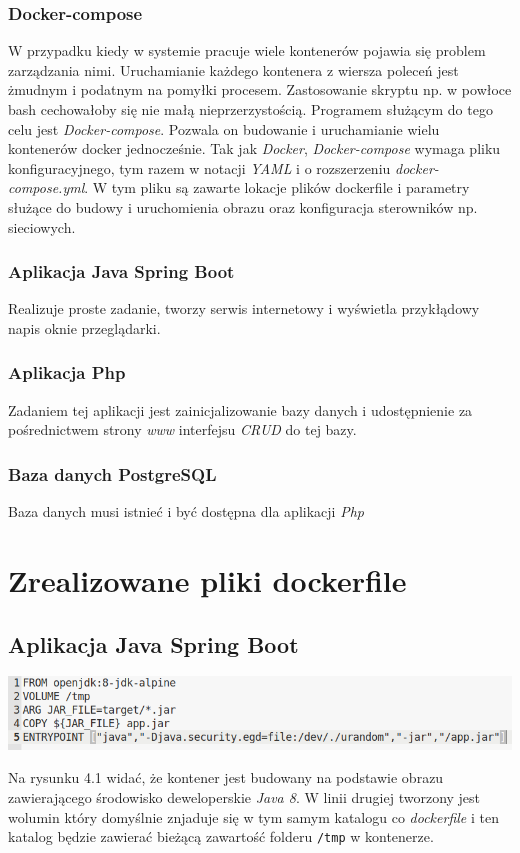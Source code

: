 \documentclass[polish, a4paper, 12pt, oneside]{book}
\begin{document}
\subsubsection{Docker-compose}
W przypadku kiedy w systemie pracuje wiele kontenerów pojawia się problem zarządzania nimi. Uruchamianie każdego kontenera z wiersza poleceń jest żmudnym i podatnym na pomyłki procesem. Zastosowanie skryptu np. w powłoce bash cechowałoby się nie małą nieprzerzystością. Programem służącym do tego celu jest \textit{Docker-compose}. Pozwala on budowanie i uruchamianie wielu kontenerów docker jednocześnie. Tak jak \textit{Docker}\cite{docker}, \textit{Docker-compose}\cite{dockercompose} wymaga pliku konfiguracyjnego, tym razem w notacji \textit{YAML} i o rozszerzeniu \textit{docker-compose.yml}. W tym pliku są zawarte lokacje plików dockerfile i parametry służące do budowy i uruchomienia obrazu oraz konfiguracja sterowników np. sieciowych. 
\subsubsection{Aplikacja Java Spring Boot}
Realizuje proste zadanie, tworzy serwis internetowy i wyświetla przykłądowy napis oknie przeglądarki.
\subsubsection{Aplikacja Php}
Zadaniem tej aplikacji jest zainicjalizowanie bazy danych i udostępnienie za pośrednictwem strony \textit{www} interfejsu \textit{CRUD} do tej bazy.
\subsubsection{Baza danych PostgreSQL}
Baza danych musi istnieć i być dostępna dla aplikacji \textit{Php}
\section{Zrealizowane pliki dockerfile}
\subsection{Aplikacja Java Spring Boot}
\begin{center}
\includegraphics[width=160mm]{dockerfile_java.png}
\end{center}
Na rysunku 4.1 widać, że kontener jest budowany na podstawie obrazu zawierającego środowisko deweloperskie \textit{Java 8}\cite{java}. W linii drugiej tworzony jest wolumin który domyślnie znjaduje się w tym samym katalogu co \textit{dockerfile} i ten katalog będzie zawierać bieżącą zawartość folderu \texttt{/tmp} w kontenerze.
\end{document}
